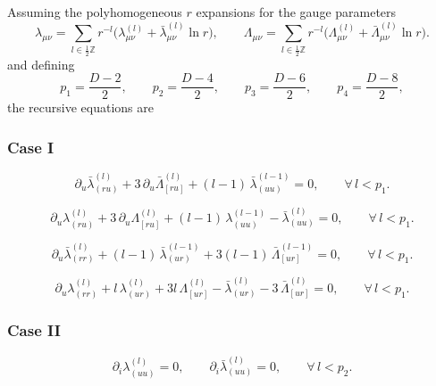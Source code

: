 \documentclass[a4paper,12pt]{article}
\begin{document}
Assuming the polyhomogeneous $r$ expansions for the gauge parameters
\begin{equation}
\lambda_{\mu\nu}
=\sum_{l\in\frac12\mathbb Z} r^{-l}
\bigl(\lambda_{\mu\nu}^{(l)}+\bar\lambda_{\mu\nu}^{(l)}\ln r\bigr),
\qquad
\Lambda_{\mu\nu}
=\sum_{l\in\frac12\mathbb Z} r^{-l}
\bigl(\Lambda_{\mu\nu}^{(l)}+\bar\Lambda_{\mu\nu}^{(l)}\ln r\bigr).
\end{equation}
and defining
\[
p_1=\frac{D-2}{2},\qquad
p_2=\frac{D-4}{2},\qquad
p_3=\frac{D-6}{2},\qquad
p_4=\frac{D-8}{2},
\]
the recursive equations are


\subsubsection*{Case I}
\begin{equation}
\partial_u \bar\lambda_{(ru)}^{(l)}
+3\,\partial_u \bar\Lambda_{[ru]}^{(l)}
+(l-1)\,\bar\lambda_{(uu)}^{(l-1)}
=0,
\qquad \forall\, l<p_1 .
\end{equation}


\begin{equation}
\partial_u \lambda_{(ru)}^{(l)}
+3\,\partial_u \Lambda_{[ru]}^{(l)}
+(l-1)\,\lambda_{(uu)}^{(l-1)}
-\bar\lambda_{(uu)}^{(l)}
=0,
\qquad \forall\, l<p_1 .
\end{equation}


\begin{equation}
\partial_u \bar\lambda_{(rr)}^{(l)}
+(l-1)\,\bar\lambda_{(ur)}^{(l-1)}
+3(l-1)\,\bar\Lambda_{[ur]}^{(l-1)}
=0,
\qquad \forall\, l<p_1 .
\end{equation}


\begin{equation}
\partial_u \lambda_{(rr)}^{(l)}
+l\,\lambda_{(ur)}^{(l)}
+3l\,\Lambda_{[ur]}^{(l)}
-\bar\lambda_{(ur)}^{(l)}
-3\,\bar\Lambda_{[ur]}^{(l)}
=0,
\qquad \forall\, l<p_1 .
\end{equation}

\subsubsection*{Case II}

\begin{equation}
\partial_i \lambda_{(uu)}^{(l)}=0,
\qquad
\partial_i \bar\lambda_{(uu)}^{(l)}=0,
\qquad \forall\, l<p_2 .
\end{equation}
\end{document}
